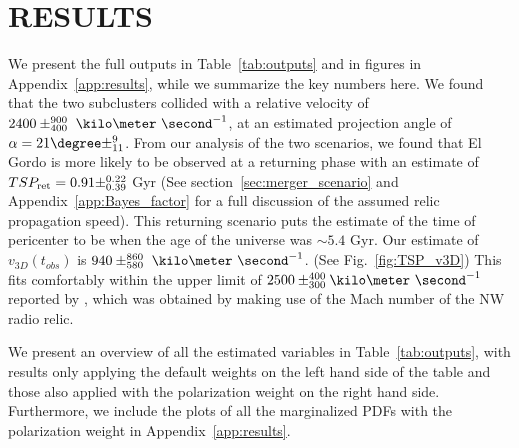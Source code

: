 \documentclass[letterpaper,useAMS,usenatbib]{mn2e}
\begin{document}
\section{RESULTS} 
We present the full outputs in Table~\ref{tab:outputs} and in figures in
Appendix~\ref{app:results}, while we summarize the key numbers here.
We found that the two subclusters collided with a relative velocity of $2400\pm^{900}_{400}~\kilo\meter~\second^{-1}$, at an estimated projection
angle of $\alpha = 21\degree\pm^{9}_{11}$. From our analysis of the two
scenarios, we found that El Gordo is more likely to be observed at a returning
phase with an estimate of $TSP_{\rm ret} = 0.91\pm^{0.22}_{0.39}$ Gyr
(See section~\ref{sec:merger_scenario} and Appendix~\ref{app:Bayes_factor}
for a full discussion of the assumed relic propagation speed). This
returning scenario puts the
estimate of the time of pericenter to be when the age of the universe was
$\sim5.4$ Gyr. 
Our estimate of $v_{3D}(t_{obs})$ is
$940\pm^{860}_{580}~\kilo\meter~\second^{-1}$. (See Fig.~\ref{fig:TSP_v3D})
This fits comfortably within the upper limit of $2500
\pm^{400}_{300}\kilo\meter~\second^{-1}$ reported by \cite{L13},
which was obtained by making use of the Mach number of the NW radio relic.
\par
We present an
overview of all the estimated variables in Table~\ref{tab:outputs}, with
results only applying the default weights on the left hand side of the table
and those also applied with the polarization weight on the right hand side.
Furthermore, we include the plots of all the marginalized PDFs with the
polarization weight in Appendix~\ref{app:results}. 

\end{document}
